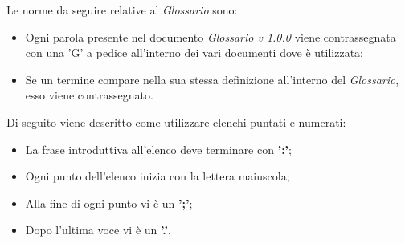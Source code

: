 Le norme da seguire relative al \textit{Glossario} sono:
\begin{itemize}
    \item Ogni parola presente nel documento \textit{Glossario v 1.0.0} viene contrassegnata con una 'G' a pedice all'interno dei vari documenti dove è utilizzata;
    \item Se un termine compare nella sua stessa definizione all'interno del \textit{Glossario}, esso viene contrassegnato.
\end{itemize}

 \label{sec:elenchi_puntati_numerati}
Di seguito viene descritto come utilizzare elenchi puntati e numerati:
\begin{itemize}
\item La frase introduttiva all'elenco deve terminare con \textbf{':'};
\item Ogni punto dell'elenco inizia con la lettera maiuscola;
\item Alla fine di ogni punto vi è un \textbf{';'};
\item Dopo l'ultima voce vi è un \textbf{'.'}.
\end{itemize}

